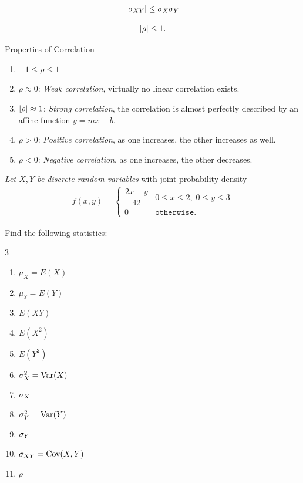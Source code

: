  \begin{teorema}
  \begin{align}
   \label{eq:2.9.28}
   \left|\sigma_{XY}\right|\leq \sigma_{X}\sigma_{Y}
  \end{align}

 \begin{align}
  \left|\rho\right|\leq 1.
 \end{align}
 \end{teorema}

{Properties of Correlation}

\begin{enumerate}
\item $-1 \leq \rho \leq 1$ 
 \item $\rho \approx 0$: \emph{Weak correlation}, virtually no linear correlation exists. 
 \item $\left|\rho\right| \approx 1$: \emph{Strong correlation}, the correlation is almost perfectly described by an affine function $y=mx+b$. 
 \item $\rho > 0$: \emph{Positive correlation}, as one increases, the other increases as well. 
 \item $\rho < 0$: \emph{Negative correlation}, as one increases, the other decreases.
\end{enumerate}

 \begin{ejemplo}
  \label{exmp:2.9.5}
  \emph{Let $X,Y$ be discrete random variables} with joint probability density
  \begin{align}f(x,y)=
   \begin{cases}
    \dfrac{2x+y}{42} & 0\leq x \leq 2,\; 0\leq y \leq 3 \\
    0 & \texttt{otherwise}.
   \end{cases}
  \end{align}
 \end{ejemplo}
 
Find the following statistics:
\begin{multicols}{3}
 \begin{enumerate}
 \item $\mu_X = E(X)$ %
 \item $\mu_Y = E(Y)$ %
 \item $ E(XY)$ %
 \item $E(X^2)$ %
 \item $E(Y^2)$ %
 \item $\sigma^2_X = \operatorname{Var}(X)$ %
 \item $\sigma_{X}$
 \item $\sigma^2_Y = \operatorname{Var}(Y)$ %
 \item $\sigma_{Y}$
 \item $\sigma_{XY} =\operatorname{Cov}(X,Y)$ %
 \item $\rho$
\end{enumerate}
\end{multicols}

